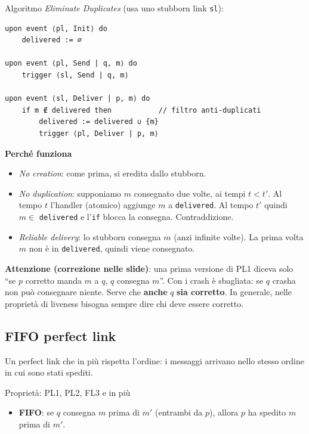 Algoritmo \emph{Eliminate Duplicates} (usa uno stubborn link \texttt{sl}):

\begin{verbatim}
upon event ⟨pl, Init⟩ do
    delivered := ∅

upon event ⟨pl, Send | q, m⟩ do
    trigger ⟨sl, Send | q, m⟩

upon event ⟨sl, Deliver | p, m⟩ do
    if m ∉ delivered then           // filtro anti-duplicati
        delivered := delivered ∪ {m}
        trigger ⟨pl, Deliver | p, m⟩
\end{verbatim}

\textbf{Perché funziona}

\begin{itemize}
\tightlist
\item
  \emph{No creation}: come prima, si eredita dallo stubborn.
\item
  \emph{No duplication}: supponiamo \(m\) consegnato due volte, ai tempi \(t < t'\). Al tempo \(t\) l'handler (atomico) aggiunge \(m\) a \texttt{delivered}. Al tempo \(t'\) quindi \(m \in\) \texttt{delivered} e l'\texttt{if} blocca la consegna. Contraddizione.
\item
  \emph{Reliable delivery}: lo stubborn consegna \(m\) (anzi infinite volte). La prima volta \(m\) non è in \texttt{delivered}, quindi viene consegnato.
\end{itemize}

\textbf{Attenzione (correzione nelle slide)}: una prima versione di PL1 diceva solo ``se \(p\) corretto manda \(m\) a \(q\), \(q\) consegna \(m\)''. Con i crash è sbagliata: se \(q\) crasha non può consegnare niente. Serve che \textbf{anche} \(q\) \textbf{sia corretto}. In generale, nelle proprietà di liveness bisogna sempre dire chi deve essere corretto.

\subsection{FIFO perfect link}

\begin{inbreve}

Un perfect link che in più rispetta l'ordine: i messaggi arrivano nello stesso ordine in cui sono stati spediti.

\end{inbreve}

Proprietà: PL1, PL2, FL3 e in più

\begin{itemize}
\tightlist
\item
  \textbf{FIFO}: se \(q\) consegna \(m\) prima di \(m'\) (entrambi da \(p\)), allora \(p\) ha spedito \(m\) prima di \(m'\).
\end{itemize}

